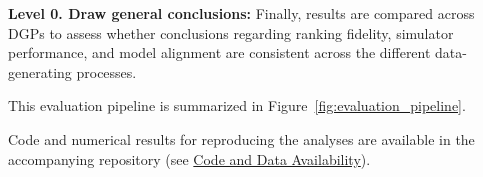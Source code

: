 \medskip

\noindent\textbf{Level 0. Draw general conclusions:} Finally, results are compared across DGPs to assess whether conclusions regarding ranking fidelity, simulator performance, and model alignment are consistent across the different data-generating processes.

\medskip

This evaluation pipeline is summarized in Figure~\ref{fig:evaluation_pipeline}.

Code and numerical results for reproducing the analyses are available in the accompanying repository (see \hyperref[sec:code-data-availability]{Code and Data Availability}).


